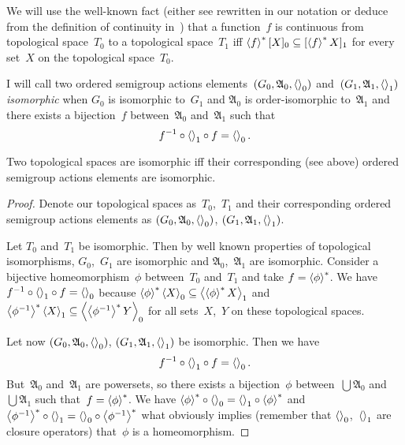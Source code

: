 We will use the well-known fact (either see \cite{bourb-top-1} rewritten in our notation or deduce from the definition of continuity in~\cite{volume-1}) that a function~$f$ is continuous from topological space~$T_0$ to a topological space~$T_1$ iff $\left\langle f\right\rangle ^{\ast}[X]_0\subseteq[\left\langle f\right\rangle ^{\ast}X]_1$ for every set~$X$ on the topological space~$T_0$.

\begin{defn}
I will call two ordered semigroup actions elements~$(G_0,\mathfrak{A}_0,\left\langle \right\rangle_0)$ and~$(G_1,\mathfrak{A}_1,\left\langle \right\rangle_1)$ \emph{isomorphic} when $G_0$ is isomorphic to~$G_1$ and $\mathfrak{A}_0$ is order-isomorphic to~$\mathfrak{A}_1$ and there exists a bijection~$f$ between~$\mathfrak{A}_0$ and~$\mathfrak{A}_1$ such that
\[ f^{-1}\circ\left\langle \right\rangle_1\circ f=\left\langle \right\rangle_0. \]
\end{defn}

\begin{thm}
Two topological spaces are isomorphic iff their corresponding (see above) ordered semigroup actions elements are isomorphic.
\end{thm}

\begin{proof}
Denote our topological spaces as~$T_0$,~$T_1$ and their corresponding ordered semigroup actions elements as $(G_0,\mathfrak{A}_0,\left\langle \right\rangle_0)$, $(G_1,\mathfrak{A}_1,\left\langle \right\rangle_1)$.

Let $T_0$ and~$T_1$ be isomorphic. Then by well known properties of topological isomorphisms, $G_0$,~$G_1$ are isomorphic and $\mathfrak{A}_0$,~$\mathfrak{A}_1$ are isomorphic. Consider a bijective homeomorphism~$\phi$ between~$T_0$ and~$T_1$ and take $f=\left\langle \phi\right\rangle ^{\ast}$. We have $f^{-1}\circ\left\langle \right\rangle_1\circ f=\left\langle \right\rangle_0$ because $\left\langle \phi\right\rangle ^{\ast}\left\langle X\right\rangle_0\subseteq\left\langle \left\langle \phi\right\rangle ^{\ast}X\right\rangle_1$ and $\left\langle \phi^{-1}\right\rangle ^{\ast}\left\langle X\right\rangle_1\subseteq\left\langle \left\langle \phi^{-1}\right\rangle ^{\ast}Y\right\rangle_0$ for all sets~$X$,~$Y$ on these topological spaces.

Let now $(G_0,\mathfrak{A}_0,\left\langle \right\rangle_0)$, $(G_1,\mathfrak{A}_1,\left\langle \right\rangle_1)$ be isomorphic.
Then we have
\[ f^{-1}\circ\left\langle \right\rangle_1\circ f=\left\langle \right\rangle_0. \]
But~$\mathfrak{A}_0$ and~$\mathfrak{A}_1$ are powersets, so there exists a bijection~$\phi$ between~$\bigcup\mathfrak{A}_0$ and~$\bigcup\mathfrak{A}_1$ such that~$f=\left\langle \phi\right\rangle ^{\ast}$.
We have $\left\langle \phi\right\rangle ^{\ast}\circ\left\langle \right\rangle_0=\left\langle \right\rangle_1\circ\left\langle \phi\right\rangle ^{\ast}$ and $\left\langle \phi^{-1}\right\rangle ^{\ast}\circ\left\langle \right\rangle_1=\left\langle \right\rangle_0\circ\left\langle \phi^{-1}\right\rangle ^{\ast}$ what obviously implies (remember that $\left\langle \right\rangle_0$,~$\left\langle \right\rangle_1$ are closure operators) that~$\phi$ is a homeomorphism.
\end{proof}

